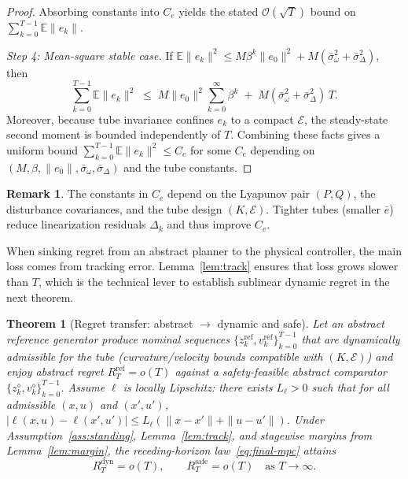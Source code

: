 \documentclass[journal]{IEEEtran}
\newtheorem{theorem}{Theorem}
\theoremstyle{definition}
\newtheorem{remark}{Remark}
\begin{document}
\begin{proof}
Absorbing constants into $C_e$ yields the stated $\mathcal{O}(\sqrt{T})$ bound on
$\sum_{k=0}^{T-1}\mathbb{E}\|e_k\|$.

\textit{Step 4: Mean-square stable case.}
If $\mathbb{E}\|e_k\|^2 \le M\beta^k \|e_0\|^2 + M(\bar\sigma_\omega^2+\bar\sigma_\Delta^2)$,
then
\[
\sum_{k=0}^{T-1}\mathbb{E}\|e_k\|^2
\;\le\; M\|e_0\|^2 \sum_{k=0}^{\infty}\beta^k
\;+\; M(\bar\sigma_\omega^2+\bar\sigma_\Delta^2)\,T.
\]
Moreover, because tube invariance confines $e_k$ to a compact $\mathcal{E}$, the steady-state
second moment is bounded independently of $T$. Combining these facts gives a uniform bound
$\sum_{k=0}^{T-1}\mathbb{E}\|e_k\|^2 \le C_e$ for some $C_e$ depending on
$(M,\beta,\|e_0\|,\bar\sigma_\omega,\bar\sigma_\Delta)$ and the tube constants.
\end{proof}

\begin{remark}
The constants in $C_e$ depend on the Lyapunov pair $(P,Q)$, the disturbance covariances,
and the tube design $(K,\mathcal{E})$. Tighter tubes (smaller $\bar e$) reduce linearization
residuals $\Delta_k$ and thus improve $C_e$.
\end{remark}
 
When sinking regret from an abstract planner to the physical controller, the main loss comes from tracking error. Lemma~\ref{lem:track} ensures that loss grows slower than $T$, which is the technical lever to establish sublinear dynamic regret in the next theorem.

\begin{theorem}[Regret transfer: abstract $\to$ dynamic and safe]
\label{thm:regret}
Let an abstract reference generator produce nominal sequences $\{z_k^{\mathrm{ref}},v_k^{\mathrm{ref}}\}_{k=0}^{T-1}$ that are dynamically admissible for the tube (curvature/velocity bounds compatible with $(K,\mathcal{E})$) and enjoy abstract regret
$R_T^{\mathrm{ref}}=o(T)$ against a safety-feasible abstract comparator $\{z_k^\diamond,v_k^\diamond\}_{k=0}^{T-1}$. 
Assume $\ell$ is locally Lipschitz: there exists $L_\ell>0$ such that for all admissible $(x,u)$ and $(x',u')$,
$|\ell(x,u){-}\ell(x',u')|\le L_\ell(\|x{-}x'\|+\|u{-}u'\|)$.
Under Assumption~\ref{ass:standing}, Lemma~\ref{lem:track}, and stagewise margins from Lemma~\ref{lem:margin}, the receding-horizon law~\eqref{eq:final-mpc} attains
\[
R_T^{\mathrm{dyn}}=o(T),\qquad R_T^{\mathrm{safe}}=o(T)\quad\text{as }T\to\infty.
\]
\end{theorem}
\end{document}
